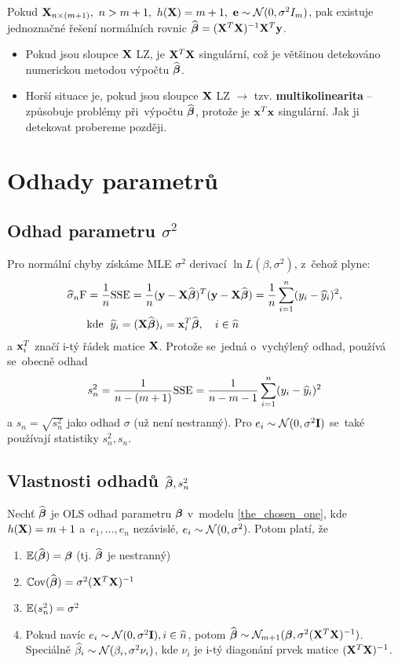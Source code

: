 \begin{remark}
	Pokud $\mathbf{X}_{n\times(m+1)},~n>m+1,~h(\mathbf{X}) = m+1,~\mathbf{e}\sim\mathcal{N}(0,\sigma^2 I_m)$, pak existuje jednoznačné řešení normálních rovnic $\widehat{\boldsymbol{\beta}} = (\mathbf{X}^T\mathbf{X})^{-1}\mathbf{X}^T\mathbf{y}$.
\end{remark}
\begin{remark}
	\begin{itemize}
		\item Pokud jsou sloupce $\mathbf{X}$ LZ, je $\mathbf{X}^T\mathbf{X}$ singulární, což je většinou detekováno numerickou metodou výpočtu $\widehat{\boldsymbol{\beta}}$.
		\item Horší situace je, pokud jsou sloupce $\mathbf{X}$  LZ $\rightarrow$ tzv. \textbf{multikolinearita} -- způsobuje problémy při~výpočtu $\widehat{\boldsymbol{\beta}}$, protože je $\mathbf{x}^T\mathbf{x}$  singulární. Jak ji detekovat probereme později.
	\end{itemize}
\end{remark}

\section{Odhady parametrů}
\subsection{Odhad parametru $\sigma^2$ }
Pro normální chyby získáme MLE $\sigma^2$ derivací $\ln L(\beta, \sigma^2)$, z~čehož plyne:
\begin{align*}
	\widehat{\sigma}_n\mathrm{F} & = \frac{1}{n} \mathrm{SSE} = \frac{1}{n}(\mathbf{y} - \mathbf{X} \widehat{\boldsymbol{\beta}})^T(\mathbf{y} - \mathbf{X} \widehat{\boldsymbol{\beta}}) = \frac{1}{n} \sum\limits_{i=1}^{n} (y_i - \widehat{y}_i)^2, \\
	& \text{kde \;} \widehat{y}_i = (\mathbf{X} \widehat{\boldsymbol{\beta}})_i = \mathbf{x}_i^T \widehat{\boldsymbol{\beta}}, \quad i\in\widehat{n} \\
\end{align*}
a $\mathbf{x}_i^T$ značí i-tý řádek matice $\mathbf{X}$. Protože se~jedná o~vychýlený odhad, používá se~obecně odhad
 $$
	s_n^2 = \frac{1}{n-(m+1)} \mathrm{SSE} = \frac{1}{n - m - 1} \sum\limits_{i=1}^{n} (y_i - \widehat{y}_i)^2
 $$
a $s_n = \sqrt{s_n^2}$ jako odhad $\sigma$ (už není nestranný).
Pro $e_i \sim \mathcal{N}(0,\sigma^2\textbf{I})$ se~také používají statistiky $s_n^2, s_n$.

\subsection{Vlastnosti odhadů $\widehat{\boldsymbol{\beta}}, s_n^2$ }
\begin{theorem}
	Nechť $\widehat{\boldsymbol{\beta}}$ je OLS odhad parametru $\boldsymbol{\beta}$ v~modelu \eqref{the_chosen_one}, kde $h(\mathbf{X}) = m+1$ a~$e_1,\dots, e_n$ nezávislé, $e_i \sim \mathcal{N}(0,\sigma^2)$. Potom platí, že
	\begin{enumerate}
		\item $\mathbb{E}(\widehat{\boldsymbol{\beta}}) = \boldsymbol{\beta}$ (tj. $\widehat{\boldsymbol{\beta}}$ je nestranný)
		\item $\mathbb{C}\mathrm{ov}(\widehat{\boldsymbol{\beta}}) = \sigma^2 (\mathbf{X}^T \mathbf{X})^{-1}$
		\item $\mathbb{E}(s_n^2) = \sigma^2$
		\item Pokud navíc $e_i \sim \mathcal{N}(0,\sigma^2\textbf{I}), i\in\widehat{n} $, potom $\widehat{\boldsymbol{\beta}} \sim \mathcal{N}_{m+1}(\boldsymbol{\beta}, \sigma^2(\mathbf{X}^T \mathbf{X})^{-1})$. Speciálně $\widehat{\beta}_i \sim \mathcal{N}(\beta_i, \sigma^2 \nu_i)$, kde $\nu_i$ je i-tý diagonání prvek matice $(\mathbf{X}^T \mathbf{X})^{-1}$.
	\end{enumerate}
\end{theorem}

